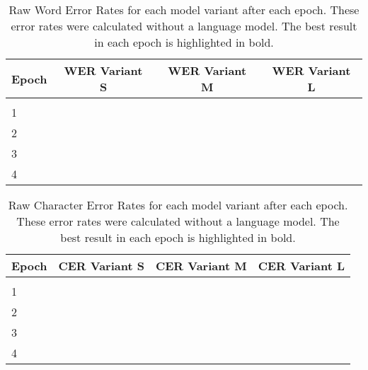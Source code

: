 \documentclass{article} \usepackage{iclr2022_conference,times}
\begin{document}
\begin{table}[p]
\begin{center}
\begin{tabular}{lccc}
Epoch & WER Variant S & WER Variant M & WER Variant L \\
\hline \\
1 &  &  &  \\
2 &  &  &  \\
3 &  &  &  \\
4 &  &  &  
\end{tabular}
\end{center}
\caption{Raw Word Error Rates for each model variant after each epoch. These error rates were calculated without a language model. The best result in each epoch is highlighted in bold.}
\label{table-results-raw-wer}
\end{table}

\begin{table}[p]
\begin{center}
\begin{tabular}{lccc}
Epoch & CER Variant S & CER Variant M & CER Variant L \\
\hline \\
1 &  &  &  \\
2 &  &  &  \\
3 &  &  &  \\
4 &  &  &  
\end{tabular}
\end{center}
\caption{Raw Character Error Rates for each model variant after each epoch. These error rates were calculated without a language model. The best result in each epoch is highlighted in bold.}
\label{table-results-raw-cer}
\end{table}
\end{document}
